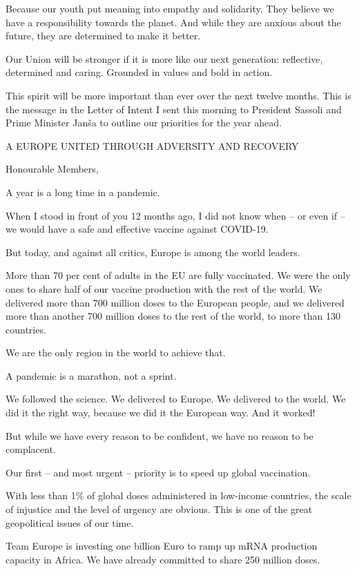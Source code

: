 \documentclass[a4paper,11pt]{article}
\begin{document}
Because our youth put meaning into empathy and solidarity.
They believe we have a responsibility towards the planet.
And while they are anxious about the future, they are determined to make it better. 

Our Union will be stronger if it is more like our next generation: reflective, determined and caring.  Grounded in values and bold in action.

This spirit will be more important than ever over the next twelve months. This is the message in the Letter of Intent I sent this morning to President Sassoli and Prime Minister Janša to outline our priorities for the year ahead.

 

A EUROPE UNITED THROUGH ADVERSITY AND RECOVERY

Honourable Members,

A year is a long time in a pandemic.

When I stood in front of you 12 months ago, I did not know when – or even if – we would have a safe and effective vaccine against COVID-19.

But today, and against all critics, Europe is among the world leaders.

More than 70 per cent of adults in the EU are fully vaccinated.  We were the only ones to share half of our vaccine production with the rest of the world. We delivered more than 700 million doses to the European people, and we delivered more than another 700 million doses to the rest of the world, to more than 130 countries.

We are the only region in the world to achieve that.

A pandemic is a marathon, not a sprint.

We followed the science.
We delivered to Europe. We delivered to the world.
We did it the right way, because we did it the European way. And it worked!

But while we have every reason to be confident, we have no reason to be complacent.

Our first – and most urgent – priority is to speed up global vaccination.

With less than 1\% of global doses administered in low-income countries, the scale of injustice and the level of urgency are obvious. This is one of the great geopolitical issues of our time.

Team Europe is investing one billion Euro to ramp up mRNA production capacity in Africa. We have already committed to share 250 million doses.
\end{document}
